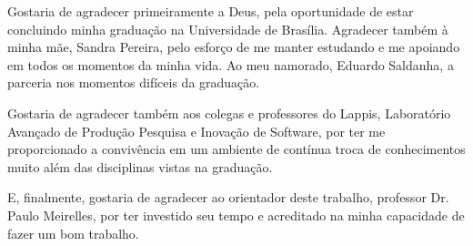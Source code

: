 \begin{agradecimentos}

Gostaria de agradecer primeiramente a Deus, pela oportunidade de estar concluindo
minha graduação na Universidade de Brasília. Agradecer também à minha mãe, 
Sandra Pereira, pelo esforço de me manter estudando e me apoiando em todos os 
momentos da minha vida. Ao meu namorado, Eduardo Saldanha, a parceria nos 
momentos difíceis da graduação.

Gostaria de agradecer também aos colegas e professores do Lappis, Laboratório
Avançado de Produção Pesquisa e Inovação de Software, por ter me proporcionado
a convivência em um ambiente de contínua troca de conhecimentos muito além das 
disciplinas vistas na graduação.
 
E, finalmente, gostaria de agradecer ao orientador deste trabalho, professor Dr.
Paulo Meirelles, por ter investido seu tempo e acreditado na minha capacidade de 
fazer um bom trabalho.

\end{agradecimentos}
